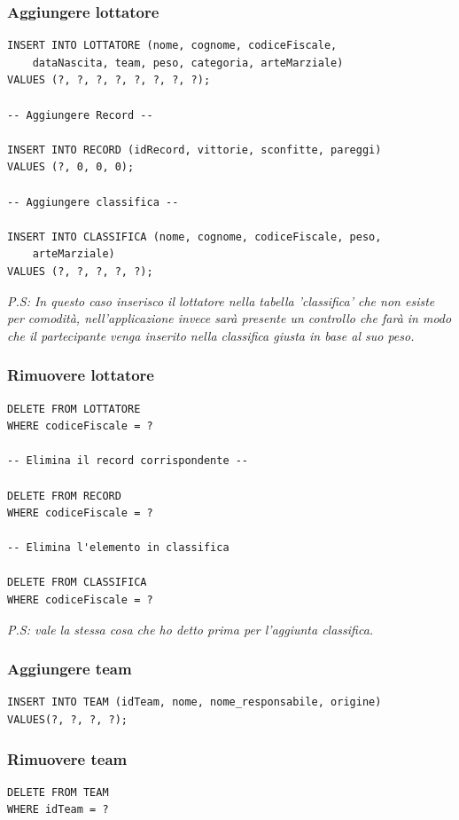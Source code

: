 \documentclass[a4paper,12pt]{report}
\begin{document}
\subsubsection{Aggiungere lottatore}
\begin{verbatim}
INSERT INTO LOTTATORE (nome, cognome, codiceFiscale, 
    dataNascita, team, peso, categoria, arteMarziale)
VALUES (?, ?, ?, ?, ?, ?, ?, ?);

-- Aggiungere Record --

INSERT INTO RECORD (idRecord, vittorie, sconfitte, pareggi)
VALUES (?, 0, 0, 0);

-- Aggiungere classifica --

INSERT INTO CLASSIFICA (nome, cognome, codiceFiscale, peso, 
    arteMarziale)
VALUES (?, ?, ?, ?, ?);

\end{verbatim}
\textsl{P.S: In questo caso inserisco il lottatore nella tabella 'classifica' che non esiste per comodità, 
nell'applicazione invece sarà presente un controllo che farà in modo che il partecipante venga 
inserito nella classifica giusta in base al suo peso.}

\subsubsection{Rimuovere lottatore}
\begin{verbatim}
DELETE FROM LOTTATORE
WHERE codiceFiscale = ?

-- Elimina il record corrispondente --

DELETE FROM RECORD
WHERE codiceFiscale = ?

-- Elimina l'elemento in classifica

DELETE FROM CLASSIFICA
WHERE codiceFiscale = ?
\end{verbatim}
\textsl{P.S: vale la stessa cosa che ho detto prima per l'aggiunta classifica.}
\subsubsection{Aggiungere team}
\begin{verbatim}
INSERT INTO TEAM (idTeam, nome, nome_responsabile, origine)
VALUES(?, ?, ?, ?);
\end{verbatim}
\subsubsection{Rimuovere team}
\begin{verbatim}
DELETE FROM TEAM 
WHERE idTeam = ?
\end{verbatim}
\end{document}
